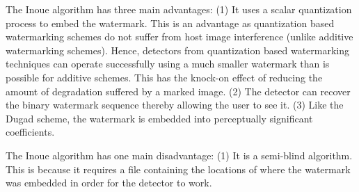 \documentclass[10pt,twocolumn]{article}
\begin{document}
The Inoue algorithm has three main advantages:
(1) It uses a scalar quantization process to embed the 
watermark. This is an advantage as quantization
based watermarking schemes do not suffer from host image
interference \cite{meerwald} (unlike additive watermarking schemes).	
Hence, detectors from quantization
based watermarking techniques can operate successfully using a much smaller
watermark than is possible for additive schemes. This has the knock-on effect
of reducing the amount of degradation suffered 
by a marked image.
(2) The detector can recover the binary watermark
sequence thereby allowing the user to see it.
(3) Like the Dugad scheme, the watermark is embedded into perceptually significant coefficients.

The Inoue algorithm has one main disadvantage:
(1) It is a semi-blind algorithm. This is because it
requires a file containing the locations of where the watermark
was embedded in order for the detector to work. 
\end{document}

